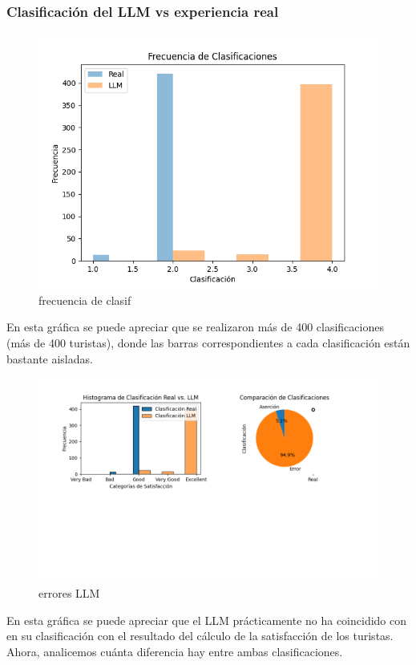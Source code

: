 \documentclass[12pt,a4paper]{article} \usepackage[spanish]{babel} \usepackage{graphicx} \usepackage{amsmath} \usepackage{amsfonts} \usepackage{amssymb} \usepackage{float} \usepackage{geometry}
\begin{document}
\subsubsection{Clasificación del LLM vs experiencia real}
\begin{figure}[H] \centering \includegraphics[width=\textwidth]{Frecuencia de clasificaciones} \caption{frecuencia de clasif} \label{fig:etiqueta} \end{figure}
En esta gráfica se puede apreciar que se realizaron más de 400 clasificaciones (más de 400 turistas), donde las barras correspondientes a cada clasificación están bastante aisladas.
\begin{figure}[H] \centering \includegraphics[width=\textwidth]{LLM classif vs real satisfaction} \caption{errores LLM} \label{fig:etiqueta} \end{figure}
En esta gráfica se puede apreciar que el LLM prácticamente no ha coincidido con en su clasificación con el resultado del cálculo de la satisfacción de los turistas. Ahora, analicemos cuánta diferencia hay entre ambas clasificaciones.
\end{document}
